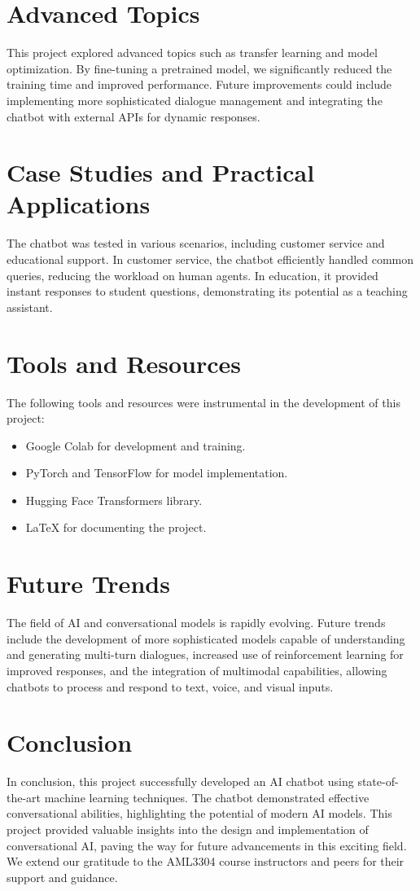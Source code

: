 \documentclass[12pt]{article}
\begin{document}
\section{Advanced Topics}
This project explored advanced topics such as transfer learning and model optimization. By fine-tuning a pretrained model, we significantly reduced the training time and improved performance. Future improvements could include implementing more sophisticated dialogue management and integrating the chatbot with external APIs for dynamic responses.

\section{Case Studies and Practical Applications}
The chatbot was tested in various scenarios, including customer service and educational support. In customer service, the chatbot efficiently handled common queries, reducing the workload on human agents. In education, it provided instant responses to student questions, demonstrating its potential as a teaching assistant.

\section{Tools and Resources}
The following tools and resources were instrumental in the development of this project:

\begin{itemize}
    \item Google Colab for development and training.
    \item PyTorch and TensorFlow for model implementation.
    \item Hugging Face Transformers library.
    \item LaTeX for documenting the project.
\end{itemize}

\section{Future Trends}
The field of AI and conversational models is rapidly evolving. Future trends include the development of more sophisticated models capable of understanding and generating multi-turn dialogues, increased use of reinforcement learning for improved responses, and the integration of multimodal capabilities, allowing chatbots to process and respond to text, voice, and visual inputs.

\section{Conclusion}
In conclusion, this project successfully developed an AI chatbot using state-of-the-art machine learning techniques. The chatbot demonstrated effective conversational abilities, highlighting the potential of modern AI models. This project provided valuable insights into the design and implementation of conversational AI, paving the way for future advancements in this exciting field. We extend our gratitude to the AML3304 course instructors and peers for their support and guidance.
\end{document}
